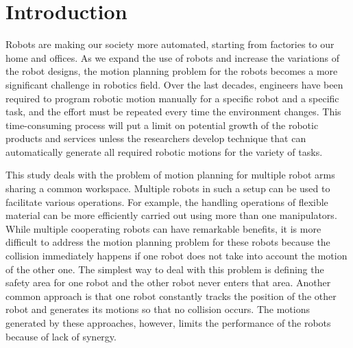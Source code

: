\documentclass[12pt]{article} %
\begin{document}

\tableofcontents %

\newpage %


\section{Introduction} %

Robots are making our society more automated, starting from factories to our home and offices. As we expand the use of robots and increase the variations of the robot designs, the motion planning problem for the robots becomes a more significant challenge in robotics field. Over the last decades, engineers have been required to program robotic motion manually for a specific robot and a specific task, and the effort must be repeated every time the environment changes. This time-consuming process will put a limit on potential growth of the robotic products and services unless the researchers develop technique that can automatically generate all required robotic motions for the variety of tasks.

This study deals with the problem of motion planning for multiple robot arms sharing a common workspace. Multiple robots in such a setup can be used to facilitate various operations. For example, the handling operations of flexible material can be more efficiently carried out using more than one manipulators. While multiple cooperating robots can have remarkable benefits, it is more difficult to address the motion planning problem for these robots because the collision immediately happens if one robot does not take into account the motion of the other one. The simplest way to deal with this problem is defining the safety area for one robot and the other robot never enters that area. Another common approach is that one robot constantly tracks the position of the other robot and generates its motions so that no collision occurs. The motions generated by these approaches, however, limits the performance of the robots because of lack of synergy.
\end{document}
